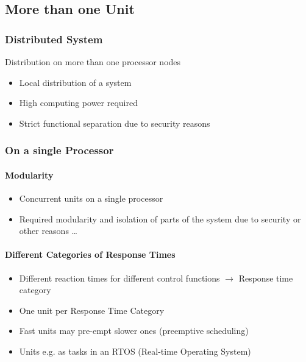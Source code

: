\subsection{More than one Unit}
\subsubsection{Distributed System}
Distribution on more than one processor nodes
\begin{itemize}
    \item Local distribution of a system
    \item High computing power required
    \item Strict functional separation due to security reasons
\end{itemize}

\subsubsection{On a single Processor}
\paragraph{Modularity}
\begin{itemize}
    \item Concurrent units on a single processor
    \item Required modularity and isolation of parts of the system due to security or other reasons …
\end{itemize}

\paragraph{Different Categories of Response Times}
\begin{itemize}
    \item Different reaction times for different control functions $\rightarrow$ Response time category
    \item One unit per Response Time Category
    \item Fast units may pre-empt slower ones (preemptive scheduling)
    \item Units e.g. as tasks in an RTOS (Real-time Operating System)
\end{itemize}